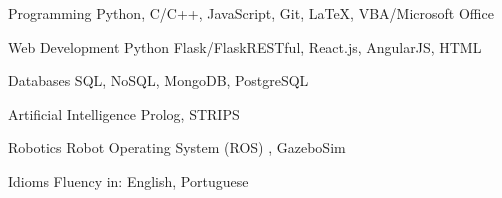 


\begin{cvskills}


\cvskill
{Programming} %
{Python, C/C++, JavaScript, Git, LaTeX, VBA/Microsoft Office} %


\cvskill
{Web Development} %
{Python Flask/FlaskRESTful, React.js, AngularJS, HTML} %



\cvskill
{Databases} %
{SQL, NoSQL, MongoDB, PostgreSQL} %



\cvskill
{Artificial Intelligence} %
{Prolog, STRIPS} %


\cvskill
{Robotics} %
{Robot Operating System (ROS) , GazeboSim} %

\cvskill
{}
{}

\cvskill
{Idioms} %
{Fluency in: English, Portuguese} %


\end{cvskills}
